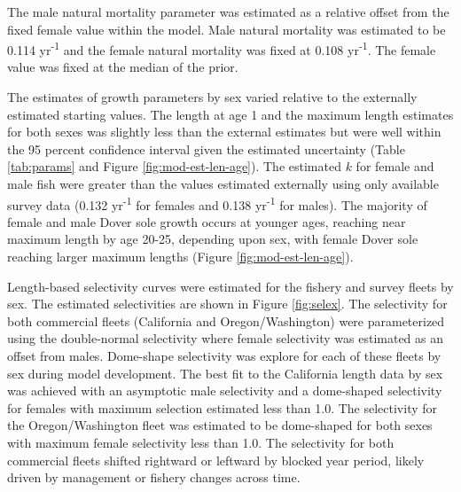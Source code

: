 \documentclass[11pt,
  english,
  a4paper,
]{article}
\begin{document}
\leavevmode\tagmcend\tagstructend


The male natural mortality parameter was estimated as a relative offset from the fixed female value within the model. Male natural mortality was estimated to be 0.114 yr\textsuperscript{-1} and the female natural mortality was fixed at 0.108 yr\textsuperscript{-1}. The female value was fixed at the median of the prior.

\leavevmode\tagmcend\tagstructend\par


The estimates of growth parameters by sex varied relative to the externally estimated starting values. The length at age 1 and the maximum length estimates for both sexes was slightly less than the external estimates but were well within the 95 percent confidence interval given the estimated uncertainty (Table \ref{tab:params} and Figure \ref{fig:mod-est-len-age}). The estimated {\(k\)\leavevmode\tagmcend\tagstructend} for female and male fish were greater than the values estimated externally using only available survey data (0.132 yr\textsuperscript{-1} for females and 0.138 yr\textsuperscript{-1} for males). The majority of female and male Dover sole growth occurs at younger ages, reaching near maximum length by age 20-25, depending upon sex, with female Dover sole reaching larger maximum lengths (Figure \ref{fig:mod-est-len-age}).

\leavevmode\tagmcend\tagstructend\par


Length-based selectivity curves were estimated for the fishery and survey fleets by sex. The estimated selectivities are shown in Figure \ref{fig:selex}. The selectivity for both commercial fleets (California and Oregon/Washington) were parameterized using the double-normal selectivity where female selectivity was estimated as an offset from males. Dome-shape selectivity was explore for each of these fleets by sex during model development. The best fit to the California length data by sex was achieved with an asymptotic male selectivity and a dome-shaped selectivity for females with maximum selection estimated less than 1.0. The selectivity for the Oregon/Washington fleet was estimated to be dome-shaped for both sexes with maximum female selectivity less than 1.0. The selectivity for both commercial fleets shifted rightward or leftward by blocked year period, likely driven by management or fishery changes across time.
\end{document}
